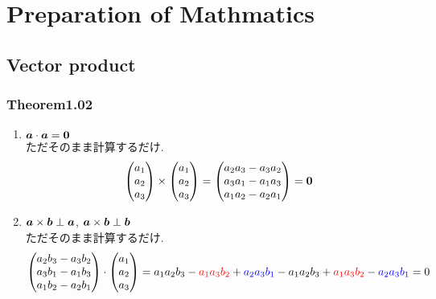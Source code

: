 \documentclass{jsarticle}
\newcommand*{\mbold}[1]{\mbox{\boldmath $#1$}}
\begin{document}
\section{Preparation of Mathmatics}
\subsection{Vector product}
\subsubsection*{Theorem1.02}\label{Theorem1.02}
\begin{enumerate}
  \item $\mbold{a} \cdot \mbold{a} = \mbold{0}$ \\
    ただそのまま計算するだけ. \\
    \[
      \begin{pmatrix}
        a_1 \\
        a_2 \\
        a_3
      \end{pmatrix}
      \times
      \begin{pmatrix}
        a_1 \\
        a_2 \\
        a_3
      \end{pmatrix}
      =
      \begin{pmatrix}
        a_2 a_3 - a_3 a_2 \\
        a_3 a_1 - a_1 a_3 \\
        a_1 a_2 - a_2 a_1
      \end{pmatrix}
      = \mbold{0}
    \]
  \item $\mbold{a} \times \mbold{b} \perp \mbold{a}$, $\mbold{a} \times \mbold{b} \perp \mbold{b}$ \\
    ただそのまま計算するだけ. \\
    \[
      \begin{pmatrix}
        a_2 b_3 - a_3 b_2 \\
        a_3 b_1 - a_1 b_3 \\
        a_1 b_2 - a_2 b_1
      \end{pmatrix}
      \cdot
      \begin{pmatrix}
        a_1 \\
        a_2 \\
        a_3
      \end{pmatrix}
      = a_1 a_2 b_3 - \textcolor{red}{a_1 a_3 b_2} + \textcolor{blue}{a_2 a_3 b_1} - a_1 a_2 b_3 + \textcolor{red}{a_1 a_3 b_2} - \textcolor{blue}{a_2 a_3 b_1} = 0 
\]
\end{enumerate}
\end{document}
